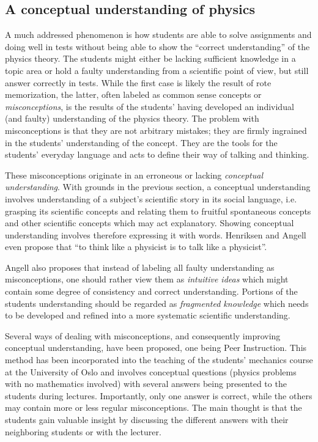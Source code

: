 \documentclass[aps,prb,floatfix,twocolumn,twoside,english]{revtex4-1}
\begin{document}
\subsection{A conceptual understanding of physics}

A much addressed phenomenon is how students are able to solve assignments and doing well in tests without being able to show the ``correct understanding'' of the physics theory.\cite{Hestenes:1992} The students might either be lacking sufficient knowledge in a topic area or hold a faulty understanding from a scientific point of view, but still answer correctly in tests. While the first case is likely the result of rote memorization, the latter, often labeled as common sense concepts or \textit{misconceptions}, is the results of the students' having developed an individual (and faulty) understanding of the physics theory. The problem with misconceptions is that they are not arbitrary mistakes; they are firmly ingrained in the students' understanding of the concept.\cite{Hestenes:1985,Gautreau:1997} They are the tools for the students' everyday language and acts to define their way of talking and thinking.\cite{Mortimer:2003} 

These misconceptions originate in an erroneous or lacking \textit{conceptual understanding}. With grounds in the previous section, a conceptual understanding involves understanding of a subject's scientific story in its social language, i.e. grasping its scientific concepts and relating them to fruitful spontaneous concepts and other scientific concepts which may act explanatory. Showing conceptual understanding involves therefore expressing it with words. Henriksen and Angell even propose that ``to think like a physicist is to talk like a physicist''.\cite{Henriksen:2010}

Angell also proposes that instead of labeling all faulty understanding as misconceptions, one should rather view them as \textit{intuitive ideas} which might contain some degree of consistency and correct understanding.\cite{Angell:2004} Portions of the students understanding should be regarded as \textit{fragmented knowledge} which needs to be developed and refined into a more systematic scientific understanding.\cite{diSessa:1993}

Several ways of dealing with misconceptions, and consequently improving conceptual understanding, have been proposed, one being Peer Instruction.\cite{Mazur:1997} This method has been incorporated into the teaching of the students' mechanics course at the University of Oslo and involves conceptual questions (physics problems with no mathematics involved) with several answers being presented to the students during lectures. Importantly, only one answer is correct, while the others may contain more or less regular misconceptions. The main thought is that the students gain valuable insight by discussing the different answers with their neighboring students or with the lecturer.\cite{Henriksen:2010}
\end{document}
